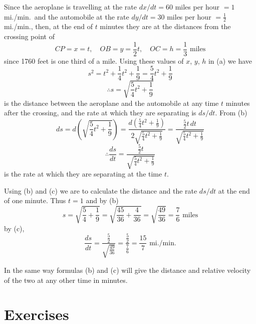 Since the aeroplane is travelling at the rate $dx/dt = 60$ miles per hour $= 1$ mi./min.\ and the automobile at the rate $dy/dt = 30$ miles per hour $= \frac{1}{2}$ mi./min., then, at the end of $t$ minutes they are at the distances from the crossing point of
\[CP = x = t, \quad OB = y = \frac{1}{2}t, \quad OC = h = \frac{1}{3}\text{ miles}\]
since 1760 feet is one third of a mile. Using these values of $x$, $y$, $h$ in (a) we have
\[s^2 = t^2 + \frac{1}{4}t^2 + \frac{1}{9} = \frac{5}{4}t^2 + \frac{1}{9}\]
\[\therefore s = \sqrt{\frac{5}{4}t^2 + \frac{1}{9}} \tag{b}\]
is the distance between the aeroplane and the automobile at any time $t$ minutes after the crossing, and the rate at which they are separating is $ds/dt$. From (b)
\[ds = d\left(\sqrt{\frac{5}{4}t^2 + \frac{1}{9}}\right) = \frac{d(\frac{5}{4}t^2 + \frac{1}{9})}{2\sqrt{\frac{5}{4}t^2 + \frac{1}{9}}} = \frac{\frac{5}{2}t\,dt}{\sqrt{\frac{5}{4}t^2 + \frac{1}{9}}}\]
\[\therefore \frac{ds}{dt} = \frac{\frac{5}{2}t}{\sqrt{\frac{5}{4}t^2 + \frac{1}{9}}} \tag{c}\]
is the rate at which they are separating at the time $t$.

Using (b) and (c) we are to calculate the distance and the rate $ds/dt$ at the end of one minute. Thus $t = 1$ and by (b)
\[s = \sqrt{\frac{5}{4} + \frac{1}{9}} = \sqrt{\frac{45}{36} + \frac{4}{36}} = \sqrt{\frac{49}{36}} = \frac{7}{6}\text{ miles}\]
by (c),
\[\frac{ds}{dt} = \frac{\frac{5}{2}}{\sqrt{\frac{49}{36}}} = \frac{\frac{5}{2}}{\frac{7}{6}} = \frac{15}{7}\text{ mi./min.}\]

In the same way formulas (b) and (c) will give the distance and relative velocity of the two at any other time in minutes.

\section*{Exercises}

